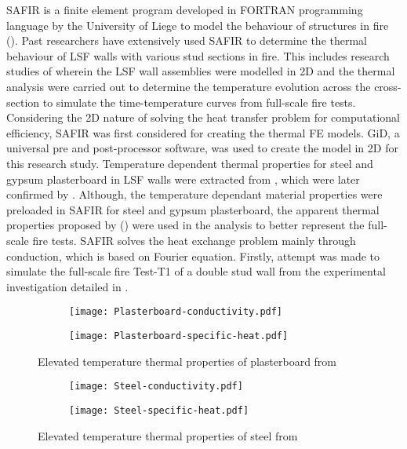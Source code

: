 SAFIR is a finite element program developed in FORTRAN programming language by the University of Liege to model the behaviour of structures in fire (\citet{safir2017}). Past researchers have extensively used SAFIR to determine the thermal behaviour of LSF walls with various stud sections in fire. This includes research studies of \citet{Keerthan2012a,Keerthan2013} wherein the LSF wall assemblies were modelled in 2D and the thermal analysis were carried out to determine the temperature evolution across the cross-section to simulate the time-temperature curves from full-scale fire tests. Considering the 2D nature of solving the heat transfer problem for computational efficiency, SAFIR was first considered for creating the thermal FE models. GiD, a universal pre and post-processor software, was used to create the model in 2D for this research study. Temperature dependent thermal properties for steel and gypsum plasterboard in LSF walls were extracted from \citet{Maneesha2018}, which were later confirmed by \citet{Steau2020}. Although, the temperature dependant material properties were preloaded in SAFIR for steel and gypsum plasterboard, the apparent thermal properties proposed by \citet{Maneesha2018} () were used in the analysis to better represent the full-scale fire tests. SAFIR solves the heat exchange problem mainly through conduction, which is based on Fourier equation. Firstly, attempt was made to simulate the full-scale fire Test-T1 of a double stud wall from the experimental investigation detailed in . 
\begin{figure}[!htbp]
	\centering
	\begin{subfigure}[b]{0.6\textwidth}
		\centering
		\texttt{[image: Plasterboard-conductivity.pdf]}
		\caption{}
		\label{subfig:Plasterboard-conductivity}
	\end{subfigure}
	\begin{subfigure}[b]{0.6\textwidth}
		\centering
		\texttt{[image: Plasterboard-specific-heat.pdf]}
		\caption{}
		\label{subfig:Plasterboard-specific-heat}
	\end{subfigure}
	   \caption{Elevated temperature thermal properties of plasterboard from \citet{Maneesha2018}}
	   \label{fig:plasterboard-thermal}
\end{figure}
\begin{figure}[!htbp]
	\centering
	\begin{subfigure}[b]{0.6\textwidth}
		\centering
		\texttt{[image: Steel-conductivity.pdf]}
		\caption{}
		\label{subfig:Steel-conductivity}
	\end{subfigure}
	\begin{subfigure}[b]{0.6\textwidth}
		\centering
		\texttt{[image: Steel-specific-heat.pdf]}
		\caption{}
		\label{subfig:Steel-specific-heat}
	\end{subfigure}
	   \caption{Elevated temperature thermal properties of steel from \citet{Maneesha2018}}
	   \label{fig:Steel-thermal}
\end{figure}
